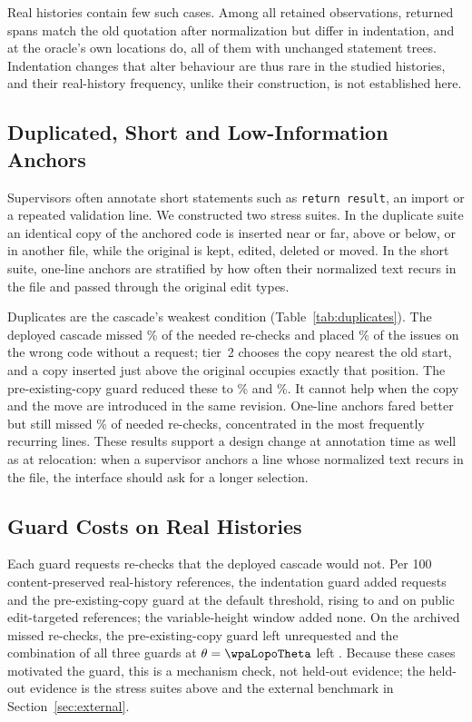 Real histories contain few such cases. Among all retained observations, \bRealIndentReturned{} returned spans match the old quotation after normalization but differ in indentation, and at the oracle's own locations \bRealIndentOracle{} do, all of them with unchanged statement trees. Indentation changes that alter behaviour are thus rare in the studied histories, and their real-history frequency, unlike their construction, is not established here.

\subsection{Duplicated, Short and Low-Information Anchors}
Supervisors often annotate short statements such as \texttt{return result}, an import or a repeated validation line. We constructed two stress suites. In the duplicate suite an identical copy of the anchored code is inserted near or far, above or below, or in another file, while the original is kept, edited, deleted or moved. In the short suite, one-line anchors are stratified by how often their normalized text recurs in the file and passed through the original edit types.

Duplicates are the cascade's weakest condition (Table~\ref{tab:duplicates}). The deployed cascade missed \bDupMissDeployed\% of the needed re-checks and placed \bDupSilentDeployed\% of the issues on the wrong code without a request; tier~2 chooses the copy nearest the old start, and a copy inserted just above the original occupies exactly that position. The pre-existing-copy guard reduced these to \bDupMissAG\% and \bDupSilentAG\%. It cannot help when the copy and the move are introduced in the same revision. One-line anchors fared better but still missed \bShortMissDeployed\% of needed re-checks, concentrated in the most frequently recurring lines. These results support a design change at annotation time as well as at relocation: when a supervisor anchors a line whose normalized text recurs in the file, the interface should ask for a longer selection.

\subsection{Guard Costs on Real Histories}
Each guard requests re-checks that the deployed cascade would not. Per 100 content-preserved real-history references, the indentation guard added \bIGExtraReal{} requests and the pre-existing-copy guard \bAGExtraReal{} at the default threshold, rising to \bIGExtraPubTgt{} and \bAGExtraPubTgt{} on public edit-targeted references; the variable-height window added none. On the \wpaMissTotal{} archived missed re-checks, the pre-existing-copy guard left \bArchivedMissAG{} unrequested and the combination of all three guards at $\theta=\wpaLopoTheta$ left \bArchivedMissAllCal{}. Because these cases motivated the guard, this is a mechanism check, not held-out evidence; the held-out evidence is the stress suites above and the external benchmark in Section~\ref{sec:external}.

